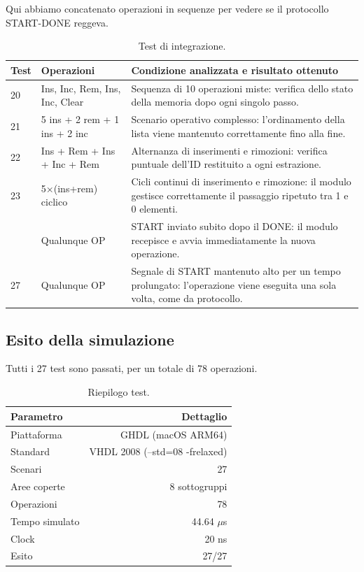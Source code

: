 \documentclass[a4paper,12pt]{article}
\begin{document}
Qui abbiamo concatenato operazioni in sequenze per vedere se il protocollo START-DONE reggeva.

\begin{table}[H]
\centering
\small
\begin{tabular}{@{}llp{8cm}@{}}
\toprule
\textbf{Test} & \textbf{Operazioni} & \textbf{Condizione analizzata e risultato ottenuto} \\
\midrule
20 & Ins, Inc, Rem, Ins, Inc, Clear & Sequenza di 10 operazioni miste: verifica dello stato della memoria dopo ogni singolo passo. \\
21 & 5 ins + 2 rem + 1 ins + 2 inc & Scenario operativo complesso: l'ordinamento della lista viene mantenuto correttamente fino alla fine. \\
22 & Ins + Rem + Ins + Inc + Rem & Alternanza di inserimenti e rimozioni: verifica puntuale dell'ID restituito a ogni estrazione. \\
23 & 5$\times$(ins+rem) ciclico & Cicli continui di inserimento e rimozione: il modulo gestisce correttamente il passaggio ripetuto tra 1 e 0 elementi. \\
\addlinespace
26 & Qualunque OP & START inviato subito dopo il DONE: il modulo recepisce e avvia immediatamente la nuova operazione. \\
27 & Qualunque OP & Segnale di START mantenuto alto per un tempo prolungato: l'operazione viene eseguita una sola volta, come da protocollo. \\
\bottomrule
\end{tabular}
\caption{Test di integrazione.}
\label{tab:test_integ}
\end{table}

\subsection{Esito della simulazione}

Tutti i 27 test sono passati, per un totale di 78 operazioni.

\begin{table}[H]
\centering
\begin{tabular}{lr}
\toprule
Parametro & Dettaglio \\
\midrule
Piattaforma & GHDL (macOS ARM64) \\
Standard & VHDL 2008 (--std=08 -frelaxed) \\
Scenari & 27 \\
Aree coperte & 8 sottogruppi \\
Operazioni & 78 \\
Tempo simulato & 44.64 $\mu$s \\
Clock & 20 ns \\
Esito & 27/27 \\
\bottomrule
\end{tabular}
\caption{Riepilogo test.}
\label{tab:simulazione}
\end{table}
\end{document}
